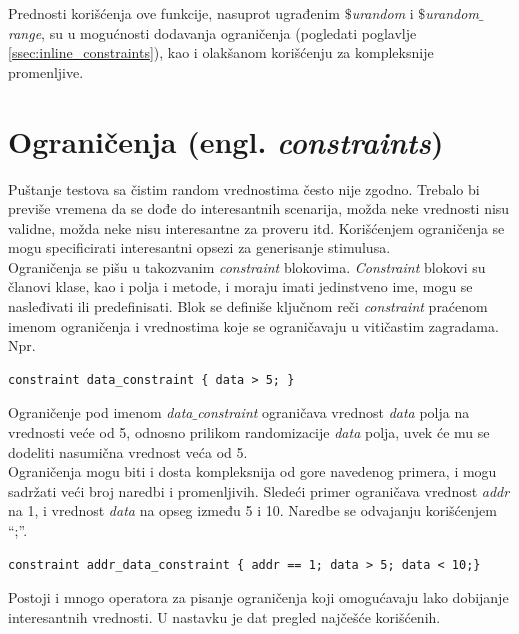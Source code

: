 Prednosti korišćenja ove funkcije, nasuprot ugrađenim \emph{\(\$\)urandom} i
\emph{\(\$\)urandom\(\_\)range}, su u mogućnosti dodavanja ograničenja
(pogledati poglavlje \ref{ssec:inline_constraints}), kao i olakšanom korišćenju
za kompleksnije promenljive.


\section{Ograničenja (engl. \emph{constraints})}

Puštanje testova sa čistim random vrednostima često nije zgodno. Trebalo bi
previše vremena da se dođe do interesantnih scenarija, možda neke vrednosti
nisu validne, možda neke nisu interesantne za proveru itd. Korišćenjem
ograničenja se mogu specificirati interesantni opsezi za generisanje
stimulusa.\\

Ograničenja se pišu u takozvanim \emph{constraint} blokovima. \emph{Constraint}
blokovi su članovi klase, kao i polja i metode, i moraju imati jedinstveno ime,
mogu se nasleđivati ili predefinisati. Blok se definiše ključnom reči
\emph{constraint} praćenom imenom ograničenja i vrednostima koje se ograničavaju
u vitičastim zagradama. Npr.

\begin{lstlisting}
constraint data_constraint { data > 5; }
\end{lstlisting}

Ograničenje pod imenom \emph{data\(\_\)constraint} ograničava vrednost
\emph{data} polja na vrednosti veće od 5, odnosno prilikom randomizacije
\emph{data} polja, uvek će mu se dodeliti nasumična vrednost veća od 5.\\

Ograničenja mogu biti i dosta kompleksnija od gore navedenog primera, i mogu
sadržati veći broj naredbi i promenljivih. Sledeći primer ograničava vrednost
\emph{addr} na 1, i vrednost \emph{data} na opseg između 5 i 10. Naredbe se
odvajanju korišćenjem ``;''.

\begin{lstlisting}
constraint addr_data_constraint { addr == 1; data > 5; data < 10;}
\end{lstlisting}

Postoji i mnogo operatora za pisanje ograničenja koji omogućavaju lako dobijanje
interesantnih vrednosti. U nastavku je dat pregled najčešće korišćenih.

